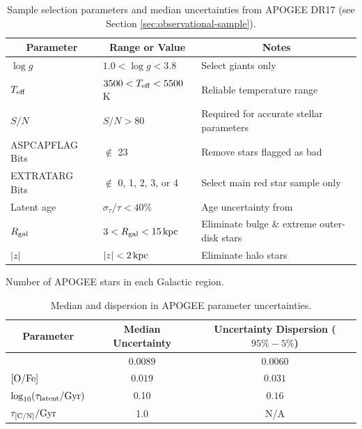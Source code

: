 \documentclass[twocolumn,twocolappendix,linenumbers]{aastex631}
\newcommand{\mathOFe}{{\rm [O/Fe]}}
\newcommand{\todo}[1]{{\color{red}#1}}
\begin{document}
\begin{table}
    \centering
    \caption{Sample selection parameters and median uncertainties from APOGEE DR17 (see Section \ref{sec:observational-sample}).}
    \label{tab:sample}
    \begin{tabular}{lll}
        \hline\hline
        \multicolumn{1}{c}{Parameter} & \multicolumn{1}{c}{Range or Value} & \multicolumn{1}{c}{Notes} \\
        \hline
        $\log g$            & $1.0 < \log g < 3.8$          & Select giants only \\
        $T_{\rm eff}$       & $3500 < T_{\rm eff} < 5500$ K & Reliable temperature range \\
        $S/N$               & $S/N > 80$                    & Required for accurate stellar parameters \\
        ASPCAPFLAG Bits     & $\notin$ 23                   & Remove stars flagged as bad \\
        EXTRATARG Bits      & $\notin$ 0, 1, 2, 3, or 4     & Select main red star sample only \\
        Latent age          & $\sigma_\tau/\tau < 40\%$     & Age uncertainty from \citet{leung_variational_2023} \\
        $R_{\rm gal}$     & $3 < R_{\rm gal} < 15\,{\rm kpc}$    & Eliminate bulge \& extreme outer-disk stars \\
        $|z|$               & $|z| < 2\,{\rm kpc}$                 & Eliminate halo stars \\
        \hline
    \end{tabular}
\end{table}

\begin{table}
\centering
\caption{Number of APOGEE stars in each Galactic region.}
\label{tab:apogee-regions}

\end{table}

\begin{table}
    \centering
    \caption{Median and dispersion in APOGEE parameter uncertainties.}
    \label{tab:uncertainties}
    \begin{tabular}{lcc}
        \hline\hline
        \multicolumn{1}{c}{Parameter} & \multicolumn{1}{c}{Median Uncertainty} & \multicolumn{1}{c}{Uncertainty Dispersion ($95\%-5\%$)} \\
        \hline
        [Fe/H]          & $0.0089$   & $0.0060$ \\
        $\mathOFe$  & $0.019$    & $0.031$ \\
        $\log_{10}(\tau_{\rm latent}/{\rm Gyr})$    & 0.10   & $0.16$ \\
        $\tau_{\rm [C/N]}/{\rm Gyr}$     & 1.0   & \todo{N/A} \\
        \hline
    \end{tabular}
\end{table}
\end{document}
